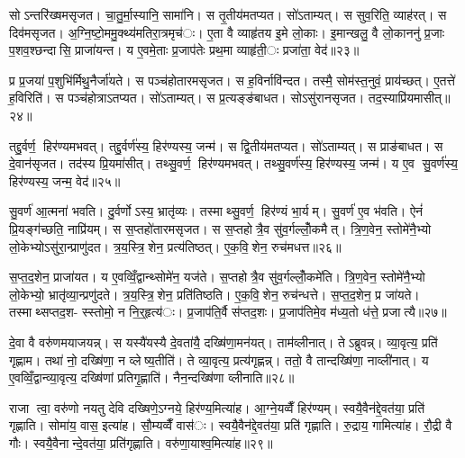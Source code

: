 सोऽन्तरि॑ख्षमसृजत। चा॒तु॒र्मा॒स्यानि॒ सामा॑नि। स तृ॒तीय॑मतप्यत। सो॑ऽताम्यत्। स सुव॒रिति॒ व्याह॑रत्। स दिव॑मसृजत। अ॒ग्नि॒ष्टो॒ममु॒क्थ्य॑मतिरा॒त्रमृच॑ः। ए॒ता वै व्याहृ॑तय इ॒मे लो॒काः। इ॒मान्खलु॒ वै लो॒काननु॑ प्र॒जाः प॒शव॒श्छन्दासि॒ प्राजा॑यन्त। य ए॒वमे॒ताः प्र॒जाप॑तेः प्रथ॒मा व्याहृ॑ती॒ः प्रजा॑ता॒ वेद॑॥२३॥

प्र प्र॒जया॑ प॒शुभि॑र्मिथु॒नैर्जा॑यते। स पञ्च॑होतारमसृजत। स ह॒विर्नावि॑न्दत। तस्मै॒ सोम॑स्त॒नुवं॒ प्राय॑च्छत्। ए॒तत्ते॑ ह॒विरिति॑। स पञ्च॑होत्राऽतप्यत। सो॑ऽताम्यत्। स प्र॒त्यङ्ङ॑बाधत। सोऽसु॑रानसृजत। तद॒स्याप्रि॑यमासीत्॥२४॥

तद्दु॒र्वर्ण॒ हिर॑ण्यमभवत्। तद्दु॒र्वर्ण॑स्य॒ हिर॑ण्यस्य॒ जन्म॑। स द्वि॒तीय॑मतप्यत। सो॑ऽताम्यत्। स प्राङ॑बाधत। स दे॒वान॑सृजत। तद॑स्य प्रि॒यमा॑सीत्। तथ्सु॒वर्ण॒ हिर॑ण्यमभवत्। तथ्सु॒वर्ण॑स्य॒ हिर॑ण्यस्य॒ जन्म॑। य ए॒व सु॒वर्ण॑स्य॒ हिर॑ण्यस्य॒ जन्म॒ वेद॑॥२५॥

सु॒वर्ण॑ आ॒त्मना॑ भवति। दु॒र्वर्णोऽस्य॒ भ्रातृ॑व्यः। तस्माथ्सु॒वर्ण॒ हिर॑ण्यं भा॒र्यम्। सु॒वर्ण॑ ए॒व भ॑वति। ऐनं॑ प्रि॒यङ्ग॑च्छति॒ नाप्रि॑यम्। स स॒प्तहो॑तारमसृजत। स स॒प्तहोत्रै॒व सु॑व॒र्गल्लोँ॒कमैत्। त्रि॒ण॒वेन॒ स्तोमे॑नै॒भ्यो लो॒केभ्योऽसु॑रा॒न्प्राणु॑दत। त्र॒य॒स्त्रि॒शेन॒ प्रत्य॑तिष्ठत्। ए॒क॒वि॒शेन॒ रुच॑मधत्त॥२६॥

स॒प्त॒द॒शेन॒ प्राजा॑यत। य ए॒वव्विँ॒द्वान्थ्सोमे॑न॒ यज॑ते। स॒प्तहोत्रै॒व सु॑व॒र्गल्लोँ॒कमे॑ति। त्रि॒ण॒वेन॒ स्तोमे॑नै॒भ्यो लो॒केभ्यो॒ भ्रातृ॑व्या॒न्प्रणु॑दते। त्र॒य॒स्त्रि॒शेन॒ प्रति॑तिष्ठति। ए॒क॒वि॒शेन॒ रुच॑न्धत्ते। स॒प्त॒द॒शेन॒ प्र जा॑यते। तस्माथ्सप्तद॒श- स्स्तोमो॒ न नि॒र्॒हृत्य॑ः। प्र॒जाप॑ति॒र्वै स॑प्तद॒शः। प्र॒जाप॑तिमे॒व म॑ध्य॒तो ध॑त्ते॒ प्रजात्यै॥२७॥


दे॒वा वै वरु॑णमयाजयन्न्। स यस्यै॑यस्यै दे॒वता॑यै॒ दख्षि॑णा॒मन॑यत्। ताम॑व्लीनात्। तेऽब्रुवन्न्। व्या॒वृत्य॒ प्रति॑ गृह्णाम। तथा॑ नो॒ दख्षि॑णा॒ न व्लेष्य॒तीति॑। ते व्या॒वृत्य॒ प्रत्य॑गृह्णन्न्। ततो॒ वै तान्दख्षि॑णा॒ नाव्ली॑नात्। य ए॒वव्विँ॒द्वान्व्या॒वृत्य॒ दख्षि॑णां प्रतिगृ॒ह्णाति॑। नैन॒न्दख्षि॑णा व्लीनाति॥२८॥

राजा त्वा॒ वरु॑णो नयतु देवि दख्षिणे॒ऽग्नये॒ हिर॑ण्य॒मित्या॑ह। आ॒ग्ने॒यव्वैँ हिर॑ण्यम्। स्वयै॒वैन॑द्दे॒वत॑या॒ प्रति॑ गृह्णाति। सोमा॑य॒ वास॒ इत्या॑ह। सौ॒म्यव्वैँ वास॑ः। स्वयै॒वैन॑द्दे॒वत॑या॒ प्रति॑ गृह्णाति। रु॒द्राय॒ गामित्या॑ह। रौ॒द्री वै गौः। स्वयै॒वैनान्दे॒वत॑या॒ प्रति॑गृह्णाति। वरु॑णा॒याश्व॒मित्या॑ह॥२९॥

